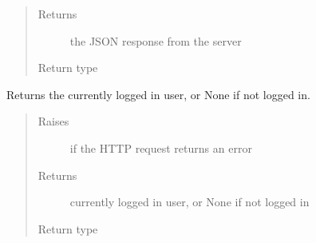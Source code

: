 \documentclass[letterpaper,10pt,english]{sphinxmanual}
\begin{document}
\begin{fulllineitems}
\begin{fulllineitems}
\begin{quote}
\begin{description}
\item[{Returns}] \leavevmode
\sphinxAtStartPar
the JSON response from the server

\item[{Return type}] \leavevmode
\sphinxAtStartPar
{}

\end{description}\end{quote}

\end{fulllineitems}


\begin{fulllineitems}
\label{\detokenize{autoapi/pine/client/index:pine.client.PineClient.get_logged_in_user}}
\sphinxAtStartPar
Returns the currently logged in user, or None if not logged in.
\begin{quote}\begin{description}
\item[{Raises}] \leavevmode
\sphinxAtStartPar
{\hyperref[\detokenize{autoapi/pine/client/exceptions/index:pine.client.exceptions.PineClientHttpException}]{}} \textendash{} if the HTTP request returns an error

\item[{Returns}] \leavevmode
\sphinxAtStartPar
currently logged in user, or None if not logged in

\item[{Return type}] \leavevmode
\sphinxAtStartPar
{}

\end{description}\end{quote}

\end{fulllineitems}



\end{fulllineitems}
\end{document}
